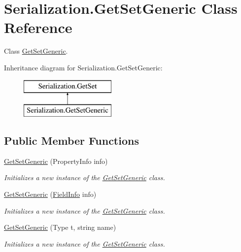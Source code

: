 \hypertarget{class_serialization_1_1_get_set_generic}{}\section{Serialization.\+Get\+Set\+Generic Class Reference}
\label{class_serialization_1_1_get_set_generic}


Class \hyperlink{class_serialization_1_1_get_set_generic}{Get\+Set\+Generic}.  


Inheritance diagram for Serialization.\+Get\+Set\+Generic\+:\begin{figure}[H]
\begin{center}
\leavevmode
\includegraphics[height=2.000000cm]{class_serialization_1_1_get_set_generic}
\end{center}
\end{figure}
\subsection*{Public Member Functions}
\begin{DoxyCompactItemize}
\item 
\hyperlink{class_serialization_1_1_get_set_generic_a4e6eed71f2c2d5ae431263da5dcd5a68}{Get\+Set\+Generic} (Property\+Info info)
\begin{DoxyCompactList}\small\item\em Initializes a new instance of the \hyperlink{class_serialization_1_1_get_set_generic}{Get\+Set\+Generic} class. \end{DoxyCompactList}\item 
\hyperlink{class_serialization_1_1_get_set_generic_a03e2851564f498ef4eb251f31ddd1dcb}{Get\+Set\+Generic} (\hyperlink{class_serialization_1_1_get_set_a1023fc00dbf0857c5a41dbad0b791a8c}{Field\+Info} info)
\begin{DoxyCompactList}\small\item\em Initializes a new instance of the \hyperlink{class_serialization_1_1_get_set_generic}{Get\+Set\+Generic} class. \end{DoxyCompactList}\item 
\hyperlink{class_serialization_1_1_get_set_generic_ac7ba4e9f256af2301924597b9862a841}{Get\+Set\+Generic} (Type t, string name)
\begin{DoxyCompactList}\small\item\em Initializes a new instance of the \hyperlink{class_serialization_1_1_get_set_generic}{Get\+Set\+Generic} class. \end{DoxyCompactList}\end{DoxyCompactItemize}
